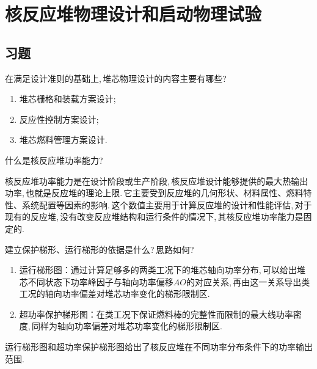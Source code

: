 \chapter{核反应堆物理设计和启动物理试验}
\section*{习题}

\begin{exercise}
    在满足设计准则的基础上,\,堆芯物理设计的内容主要有哪些?\,
    \begin{solution}
        \begin{enumerate}[(1)]
            \item 堆芯栅格和装载方案设计;\,
            \item 反应性控制方案设计;\,
            \item 堆芯燃料管理方案设计.\,
        \end{enumerate}
    \end{solution}
\end{exercise}

\begin{exercise}
    什么是核反应堆功率能力?\,
    \begin{solution}
        核反应堆功率能力是在设计阶段或生产阶段,\,核反应堆设计能够提供的最大热输出功率,\,也就是反应堆的理论上限.\,它主要受到反应堆的几何形状、材料属性、燃料特性、系统配置等因素的影响.\,这个数值主要用于计算反应堆的设计和性能评估,\,对于现有的反应堆,\,没有改变反应堆结构和运行条件的情况下,\,其核反应堆功率能力是固定的.\,
    \end{solution}
\end{exercise}

\begin{exercise}
    建立保护梯形、运行梯形的依据是什么?\,思路如何?\,
    \begin{solution}
        \begin{enumerate}[(1)]
            \item 运行梯形图：通过计算足够多的两类工况下的堆芯轴向功率分布,\,可以给出堆芯不同状态下功率峰因子与轴向功率偏移$AO$的对应关系,\,再由这一关系导出\uppercase\expandafter{}类工况的轴向功率偏差对堆芯功率变化的梯形限制区.\,
            \item 超功率保护梯形图：在\uppercase\expandafter{}类工况下保证燃料棒的完整性而限制的最大线功率密度,\,同样为轴向功率偏差对堆芯功率变化的梯形限制区.\,
        \end{enumerate}
        运行梯形图和超功率保护梯形图给出了核反应堆在不同功率分布条件下的功率输出范围.\,
    \end{solution}
\end{exercise}

